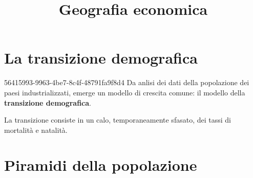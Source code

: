 \documentclass[preview]{standalone}
\begin{document}
\title{Geografia economica}
\genpage

\section{La transizione demografica}

\begin{snippet}{56415993-9963-4be7-8c4f-48791fa9f8d4}
    Da anlisi dei dati della popolazione dei paesi industrializzati,
    emerge un modello di crescita comune:
    il modello della \textbf{transizione demografica}.
    
    La transizione consiste in un calo, temporaneamente sfasato,
    dei tassi di mortalità e natalità.
\end{snippet}


\section{Piramidi della popolazione}
\end{document}
